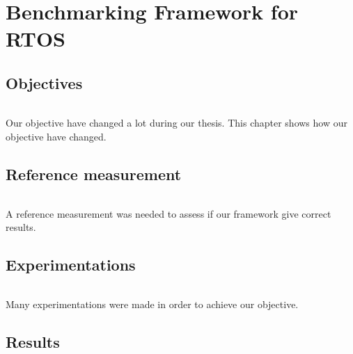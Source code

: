 \part{Benchmarking Framework for RTOS}

\chapter{Objectives}
\paragraph{}
Our objective have changed a lot during our thesis.
This chapter shows how our objective have changed.




\chapter{Reference measurement}
\paragraph{}
A reference measurement was needed to assess if our framework give correct results.




\chapter{Experimentations}

\paragraph{}
Many experimentations were made in order to achieve our objective.






\chapter{Results}
